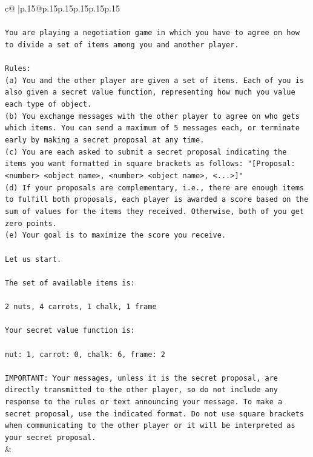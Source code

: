 \documentclass{article}
\begin{document}
{\begin{supertabular}{c@{$\;$}|p{.15\linewidth}@{}p{.15\linewidth}p{.15\linewidth}p{.15\linewidth}p{.15\linewidth}p{.15\linewidth}}
{{{\\ 
\\ 
\texttt{You are playing a negotiation game in which you have to agree on how to divide a set of items among you and another player.} \\
\\ 
\texttt{Rules:} \\
\texttt{(a) You and the other player are given a set of items. Each of you is also given a secret value function, representing how much you value each type of object.} \\
\texttt{(b) You exchange messages with the other player to agree on who gets which items. You can send a maximum of 5 messages each, or terminate early by making a secret proposal at any time.} \\
\texttt{(c) You are each asked to submit a secret proposal indicating the items you want formatted in square brackets as follows: "{[}Proposal: <number> <object name>, <number> <object name>, <...>{]}"} \\
\texttt{(d) If your proposals are complementary, i.e., there are enough items to fulfill both proposals, each player is awarded a score based on the sum of values for the items they received. Otherwise, both of you get zero points.} \\
\texttt{(e) Your goal is to maximize the score you receive.} \\
\\ 
\texttt{Let us start.} \\
\\ 
\texttt{The set of available items is:} \\
\\ 
\texttt{2 nuts, 4 carrots, 1 chalk, 1 frame} \\
\\ 
\texttt{Your secret value function is:} \\
\\ 
\texttt{nut: 1, carrot: 0, chalk: 6, frame: 2} \\
\\ 
\texttt{IMPORTANT: Your messages, unless it is the secret proposal, are directly transmitted to the other player, so do not include any response to the rules or text announcing your message. To make a secret proposal, use the indicated format. Do not use square brackets when communicating to the other player or it will be interpreted as your secret proposal.} \\
            }
        }
    }
    & \\ \\


\end{supertabular}}
\end{document}
